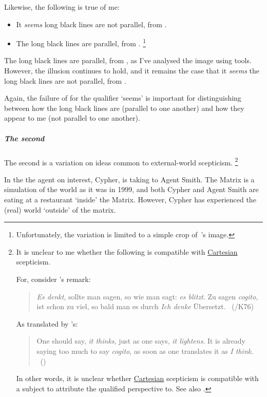 \begin{note}
  Likewise, the following is true of me:

  \begin{itemize}[noitemsep]
  \item
    It \emph{seems} long black lines are not parallel, from .
  \item
    The long black lines are parallel, from .%
    \footnote{
      Unfortunately, the variation is limited to a simple crop of~\textcite{Fibonacci:2007vj}'s image.
    }
  \end{itemize}

  The long black lines are parallel, from , as I've analysed the image using tools.
  However, the illusion continues to hold, and it remains the case that it \emph{seems} the long black lines are not parallel, from .

  Again, the failure of \ptivity{} for the qualifier `seems' is important for distinguishing between how the long black lines are (parallel to one another) and how they appear to me (not parallel to one another).
\end{note}

\subparagraph{The second }

\begin{note}
  The second  is a variation on ideas common to external-world scepticism.%
  \footnote{
    It is unclear to me whether the following  is compatible with \hyperlink{cite.Descartes:1996vp}{Cartesian} scepticism.

    For, consider \citeauthor{Lichtenberg:1991tf}'s remark:

    \begin{quote}
      \emph{Es denkt}, sollte man sagen, so wie man sagt: \emph{es blitzt}.
      Zu sagen \emph{cogito}, ist schon zu viel, so bald man es durch \emph{Ich denke} \"{U}bersetzt.
      \mbox{ }\hfill\mbox{(\citeyear[412]{Lichtenberg:1991tf}/K76)}
    \end{quote}

    As translated by \citeauthor{Zoller:1992ud}'s:

    \begin{quote}
      One should say, \emph{it thinks}, just as one says, \emph{it lightens}.
      It is already saying too much to say \emph{cogito}, as soon as one translates it as \emph{I think}.
      \mbox{ }\hfill\mbox{(\citeyear[418]{Zoller:1992ud})}
    \end{quote}

    In other words, it is unclear whether \hyperlink{cite.Descartes:1996vp}{Cartesian} scepticism is compatible with a subject to attribute the qualified perspective to.
    See also \textcite{Perry:1986aa}.
  }
  \nocite{Harman:1973ww}

  In the  the agent on interest, Cypher, is taking to Agent Smith.
  The Matrix is a simulation of the world as it was in 1999, and both Cypher and Agent Smith are eating at a restaurant `inside' the Matrix.
  However, Cypher has experienced the (real) world `outside' of the matrix.
\end{note}

